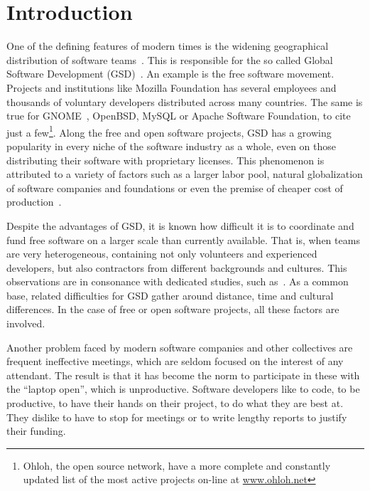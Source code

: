 \documentclass[letterpaper]{article}
\newcommand{\indraftnote}[1]{\textcolor{blue}{\texttt{\footnotesize[#1]}}}
\newcommand{\todo}[1]{\indraftnote{todo: #1}}
\begin{document}


\section{Introduction}

One of the defining features of modern times is the widening geographical
distribution of software teams~\cite{last2003}. This is responsible for the so
called Global Software Development (GSD)~\cite{german2003,Fryer,Begel}.  An example is the
free software movement. Projects and institutions like Mozilla Foundation has
several employees and thousands of voluntary developers distributed across many
countries. The same is true for GNOME~\cite{german2003}, OpenBSD, MySQL or
Apache Software Foundation, to cite just a few\footnote{Ohloh, the open source
  network, have a more complete and constantly updated list of the most active
  projects on-line at \url{www.ohloh.net}}. Along the free and open software
projects, GSD has a growing popularity in every niche of the software industry
as a whole, even on those distributing their software with proprietary
licenses. This phenomenon is attributed to a variety of factors such as a larger
labor pool, natural globalization of software companies and foundations or even
the premise of cheaper cost of production~\cite{komi2005}.

Despite the advantages of GSD, it is known how difficult it is to coordinate and
fund free software on a larger scale than currently available. That is, when
teams are very heterogeneous, containing not only volunteers and experienced
developers, but also contractors from different backgrounds and cultures. This
observations are in consonance with dedicated studies, such
as~\cite{carmel1999}.  As a common base, related difficulties for GSD gather
around distance, time and cultural differences. In the case of free or open
software projects, all these factors are involved.

Another problem faced by modern software companies and other collectives are
frequent ineffective meetings, which are seldom focused on the interest of any
attendant. The result is that it has become the norm to participate in these
with the ``laptop open'', which is unproductive. Software developers like to
code, to be productive, to have their hands on their project, to do what they
are best at. They dislike to have to stop for meetings or to write lengthy
reports to justify their funding.
\end{document}
